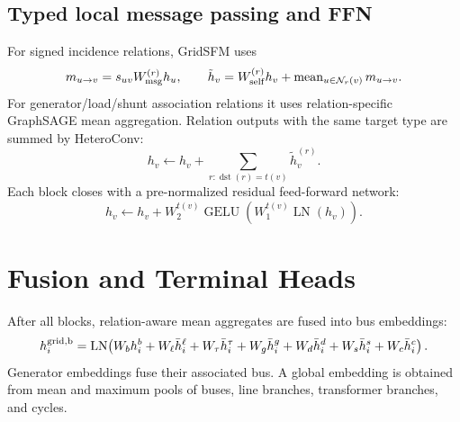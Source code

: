\documentclass[10pt]{article}
\newcommand{\LN}{\operatorname{LN}}
\begin{document}
\subsection{Typed local message passing and FFN}

For signed incidence relations, GridSFM uses
\begin{equation}
 m_{u\to v}=s_{uv}W_{\rm msg}^{(r)}h_u,\qquad
 \tilde h_v=W_{\rm self}^{(r)}h_v+\operatorname{mean}_{u\in\mathcal N_r(v)}m_{u\to v}.
\end{equation}
For generator/load/shunt association relations it uses relation-specific
GraphSAGE mean aggregation. Relation outputs with the same target type are
summed by HeteroConv:
\begin{equation}
 h_v\leftarrow h_v+\sum_{r:\operatorname{dst}(r)=t(v)}\tilde h_v^{(r)}.
\end{equation}
Each block closes with a pre-normalized residual feed-forward network:
\begin{equation}
 h_v\leftarrow h_v+W_2^{t(v)}\operatorname{GELU}
 (W_1^{t(v)}\LN(h_v)).
\end{equation}

\section{Fusion and Terminal Heads}

After all blocks, relation-aware mean aggregates are fused into bus embeddings:
\begin{equation}
 h_i^{\rm grid,b}=\LN\!\left(W_bh_i^b+W_{\ell}\bar h_i^{\ell}
 +W_{\tau}\bar h_i^{\tau}+W_g\bar h_i^g+W_d\bar h_i^d
 +W_s\bar h_i^s+W_c\bar h_i^c\right).
\end{equation}
Generator embeddings fuse their associated bus. A global embedding is obtained
from mean and maximum pools of buses, line branches, transformer branches, and
cycles.
\end{document}
